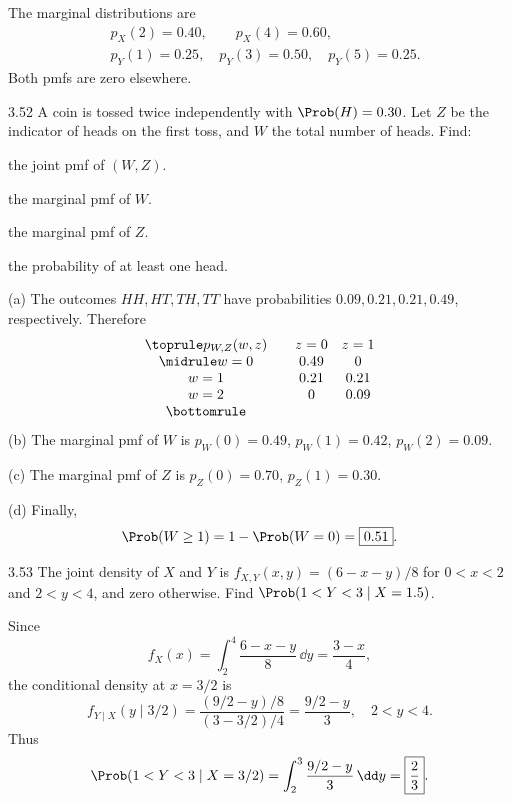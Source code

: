 \documentclass[11pt,oneside]{article}
\begin{document}
\begin{solution}
The marginal distributions are
\[
\begin{aligned}
&p_X(2)=0.40,\qquad p_X(4)=0.60,\\
&p_Y(1)=0.25,\quad p_Y(3)=0.50,\quad p_Y(5)=0.25.
\end{aligned}
\]
Both pmfs are zero elsewhere.
\end{solution}

\begin{exercise}{3.52}
A coin is tossed twice independently with $\Prob(H)=0.30$. Let $Z$ be the indicator of heads on the first toss, and $W$ the total number of heads. Find:
\begin{exercisesubparts}
\item the joint pmf of $(W,Z)$.
\item the marginal pmf of $W$.
\item the marginal pmf of $Z$.
\item the probability of at least one head.
\end{exercisesubparts}
\end{exercise}

\begin{solution}
\noindent\textup{(a)} The outcomes $HH,HT,TH,TT$ have probabilities $0.09,0.21,0.21,0.49$, respectively. Therefore
\[
\begin{array}{c@{\qquad}cc}\toprule
p_{W,Z}(w,z)&z=0&z=1\\\midrule
w=0&0.49&0\\
w=1&0.21&0.21\\
w=2&0&0.09\\\bottomrule
\end{array}
\]
\noindent\textup{(b)} The marginal pmf of $W$ is $p_W(0)=0.49$, $p_W(1)=0.42$, $p_W(2)=0.09$.\par\medskip
\noindent\textup{(c)} The marginal pmf of $Z$ is $p_Z(0)=0.70$, $p_Z(1)=0.30$.\par\medskip
\noindent\textup{(d)} Finally,
\[
\Prob(W\ge1)=1-\Prob(W=0)=\boxed{0.51}.
\]
\end{solution}

\begin{exercise}{3.53}
The joint density of $X$ and $Y$ is $f_{X,Y}(x,y)=(6-x-y)/8$ for $0<x<2$ and $2<y<4$, and zero otherwise. Find $\Prob(1<Y<3\mid X=1.5)$.
\end{exercise}

\begin{solution}
Since
\[
f_X(x)=\int_2^4\frac{6-x-y}{8}\,\dd y=\frac{3-x}{4},
\]
the conditional density at $x=3/2$ is
\[
f_{Y\mid X}(y\mid3/2)=\frac{(9/2-y)/8}{(3-3/2)/4}=\frac{9/2-y}{3},\quad2<y<4.
\]
Thus
\[
\Prob(1<Y<3\mid X=3/2)=\int_2^3\frac{9/2-y}{3}\,\dd y=\boxed{\frac23}.
\]
\end{solution}
\end{document}
